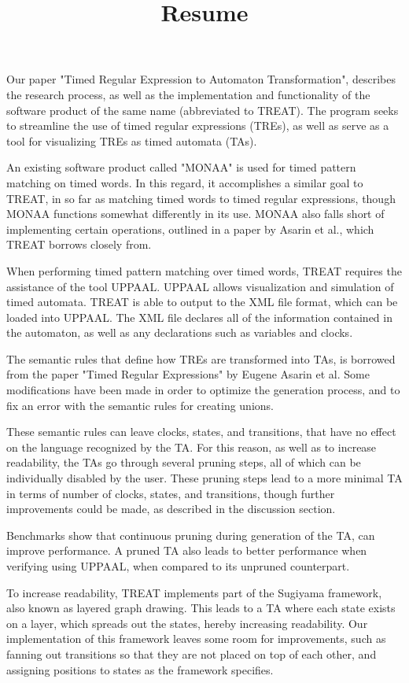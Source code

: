 \documentclass{article}
\begin{document}
\title{Resume}

Our paper "Timed Regular Expression to Automaton Transformation", describes the research process, as well as the implementation and functionality of the software product of the same name (abbreviated to TREAT).
The program seeks to streamline the use of timed regular expressions (TREs), as well as serve as a tool for visualizing TREs as timed automata (TAs).

An existing software product called "MONAA" is used for timed pattern matching on timed words. In this regard, it accomplishes a similar goal to TREAT, in so far as matching timed words to timed regular expressions, though MONAA functions somewhat differently in its use.
MONAA also falls short of implementing certain operations, outlined in a paper by Asarin et al., which TREAT borrows closely from.

When performing timed pattern matching over timed words, TREAT requires the assistance of the tool UPPAAL. UPPAAL allows visualization and simulation of timed automata. 
TREAT is able to output to the XML file format, which can be loaded into UPPAAL. The XML file declares all of the information contained in the automaton, as well as any declarations such as variables and clocks.

The semantic rules that define how TREs are transformed into TAs, is borrowed from the paper "Timed Regular Expressions" by Eugene Asarin et al. Some modifications have been made in order to optimize the generation process, and to fix an error with the semantic rules for creating unions.

These semantic rules can leave clocks, states, and transitions, that have no effect on the language recognized by the TA. For this reason, as well as to increase readability, the TAs go through several pruning steps, all of which can be individually disabled by the user.
These pruning steps lead to a more minimal TA in terms of number of clocks, states, and transitions, though further improvements could be made, as described in the discussion section.

Benchmarks show that continuous pruning during generation of the TA, can improve performance. A pruned TA also leads to better performance when verifying using UPPAAL, when compared to its unpruned counterpart.

To increase readability, TREAT implements part of the Sugiyama framework, also known as layered graph drawing. This leads to a TA where each state exists on a layer, which spreads out the states, hereby increasing readability. Our implementation of this framework leaves some room for improvements, such as fanning out transitions so that they are not placed on top of each other, and assigning positions to states as the framework specifies.
\end{document}
